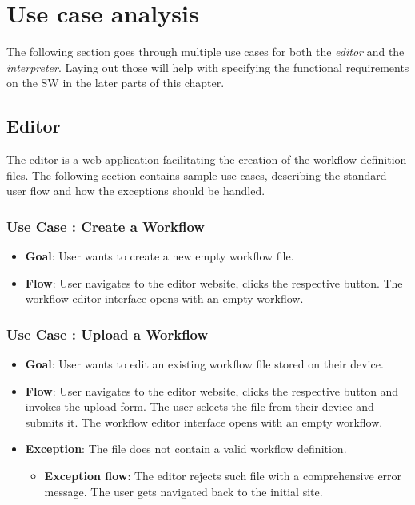 \section{Use case analysis}

The following section goes through multiple use cases for both the \textit{editor} and the \textit{interpreter}.
Laying out those will help with specifying the functional requirements on the \ac{SW} in the later parts of this chapter.

\subsection{Editor}

The editor is a web application facilitating the creation of the workflow definition files.
The following section contains sample use cases, describing the standard user flow and how the exceptions should be handled.

\setcounter{usecases}{1}

\def \usecase {Use Case }

\subsubsection*{\usecase: Create a Workflow}
\begin{itemize}
    \item \textbf{Goal}: User wants to create a new empty workflow file.
    \item \textbf{Flow}: User navigates to the editor website, clicks the respective button. 
    The workflow editor interface opens with an empty workflow.
\end{itemize}

\subsubsection*{\usecase: Upload a Workflow}
\begin{itemize}
    \item \textbf{Goal}: User wants to edit an existing workflow file stored on their device. 
    \item \textbf{Flow}: User navigates to the editor website, clicks the respective button and invokes the upload form.
    The user selects the file from their device and submits it. 
    The workflow editor interface opens with an empty workflow.
    \item \textbf{Exception}: The file does not contain a valid workflow definition.
    \begin{itemize}
        \item \textbf{Exception flow}: The editor rejects such file with a comprehensive error message. The user gets navigated back to the initial site.
    \end{itemize}
\end{itemize}

